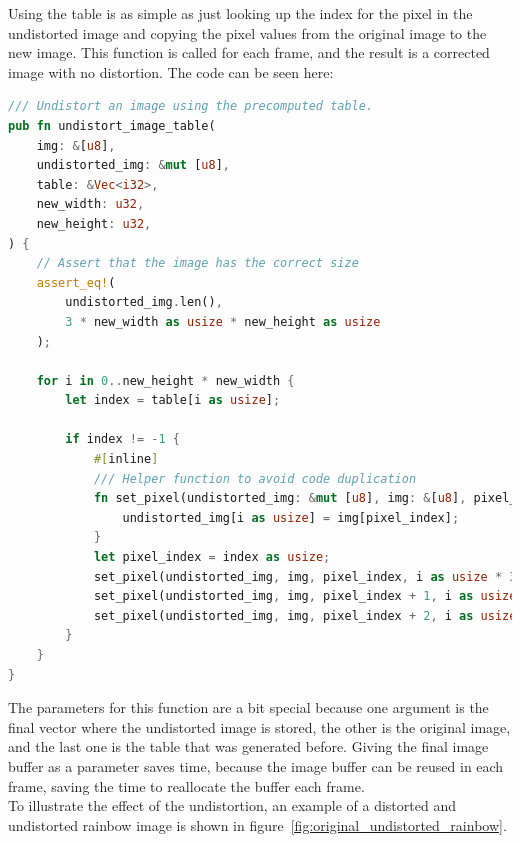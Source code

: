 Using the table is as simple as just looking up the index for the pixel in the undistorted image and copying the pixel values from the original image to the new image.
This function is called for each frame, and the result is a corrected image with no distortion.
The code can be seen here:
\begin{lstlisting}[language=rust,breaklines,label={lst:undistort_image_table}]
/// Undistort an image using the precomputed table.
pub fn undistort_image_table(
    img: &[u8],
    undistorted_img: &mut [u8],
    table: &Vec<i32>,
    new_width: u32,
    new_height: u32,
) {
    // Assert that the image has the correct size
    assert_eq!(
        undistorted_img.len(),
        3 * new_width as usize * new_height as usize
    );

    for i in 0..new_height * new_width {
        let index = table[i as usize];

        if index != -1 {
            #[inline]
            /// Helper function to avoid code duplication
            fn set_pixel(undistorted_img: &mut [u8], img: &[u8], pixel_index: usize, i: usize) {
                undistorted_img[i as usize] = img[pixel_index];
            }
            let pixel_index = index as usize;
            set_pixel(undistorted_img, img, pixel_index, i as usize * 3);
            set_pixel(undistorted_img, img, pixel_index + 1, i as usize * 3 + 1);
            set_pixel(undistorted_img, img, pixel_index + 2, i as usize * 3 + 2);
        }
    }
}
\end{lstlisting}
The parameters for this function are a bit special because one argument is the final vector where the undistorted image is stored, the other is the original image, and the last one is the table that was generated before.
Giving the final image buffer as a parameter saves time, because the image buffer can be reused in each frame, saving the time to reallocate the buffer each frame.
\\
To illustrate the effect of the undistortion, an example of a distorted and undistorted rainbow image is shown in figure~\ref{fig:original_undistorted_rainbow}.
